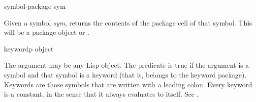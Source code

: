 \begin{defun}[Function]
symbol-package sym

Given a symbol {\it sym},  returns the contents of the
package cell of that symbol.  This will be a package object or {\nil}.
\end{defun}

\begin{defun}[Function]
keywordp object

The argument may be any Lisp object.  The predicate  is true
if the argument is a symbol and that
symbol is a keyword (that is, belongs to the keyword
package).  Keywords are those symbols that are written with
a leading colon.  Every keyword is a constant, in the sense
that it always evaluates to itself.  See .
\end{defun}
